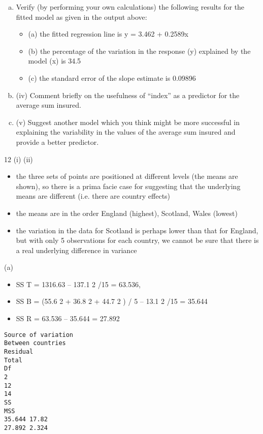 \documentclass[a4paper,12pt]{article}
\begin{document}
\begin{enumerate}[(a)]
\item Verify (by performing your own calculations) the following results for the fitted model as given in the output above:
\begin{itemize}
\item (a) the fitted regression line is y = 3.462 + 0.2589x
\item (b) the percentage of the variation in the response (y) explained by the model (x) is 34.5%
\item (c) the standard error of the slope estimate is 0.09896
\end{itemize}
\item (iv) Comment briefly on the usefulness of “index” as a predictor for the average sum insured.
\item 
(v) Suggest another model which you think might be more successful in explaining the variability in the values of the average sum insured and provide a better predictor.
\end{enumerate}
\newpage

12
(i)
(ii)
\begin{itemize}
\item the three sets of points are positioned at different levels (the means are shown), so there is a prima facie case for suggesting that the underlying means are different (i.e. there are country effects)
\item the means are in the order England (highest), Scotland, Wales (lowest) 
\item the variation in the data for Scotland is perhaps lower than that for England, but with only 5 observations for each country, we cannot be sure that there is a real underlying difference in variance
\end{itemize}
(a)
\begin{itemize}
\item SS T = 1316.63 – 137.1 2 /15 = 63.536, 
\item SS B = (55.6 2 + 36.8 2 + 44.7 2 ) /
5 – 13.1 2 /15 = 35.644
\item SS R = 63.536 – 35.644 = 27.892
\end{itemize}


\begin{verbatim}
Source of variation
Between countries
Residual
Total
Df
2
12
14
SS
MSS
35.644 17.82
27.892 2.324
\end{verbatim}
\end{document}
